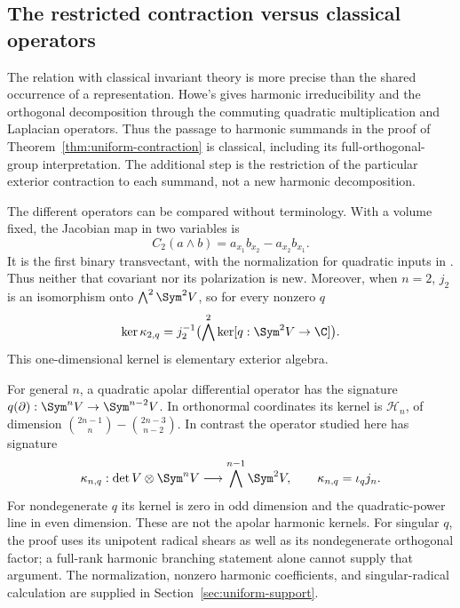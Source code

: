 \subsection{The restricted contraction versus classical operators}
\label{sec:operator-signatures}

The relation with classical invariant theory is more precise than the
shared occurrence of a representation.  Howe's
\cite[Theorem~9 and \S4(a), pp.~555--557]{HoweClassical} gives harmonic
irreducibility and the orthogonal decomposition through the commuting
quadratic multiplication and Laplacian operators.  Thus the passage
to harmonic summands in the proof of
Theorem~\ref{thm:uniform-contraction} is classical, including its
full-orthogonal-group interpretation.  The additional step is the
restriction of the particular exterior contraction to each summand,
not a new harmonic decomposition.

The different operators can be compared without terminology.  With a
volume fixed, the Jacobian map in two variables is
\[
 C_2(a\wedge b)=a_{x_1}b_{x_2}-a_{x_2}b_{x_1}.
\]
It is the first binary transvectant, with the normalization for
quadratic inputs in \cite[\S2.2, Definition~2.6 and Remark~2.7]{OliveGordan}.
Thus neither that covariant nor its polarization is new.  Moreover,
when \(n=2\), \(j_2\) is an isomorphism onto
\(\bigwedge^2\Sym^2V\), so for every nonzero \(q\)
\begin{equation}\label{eq:binary-kernel-classical}
 \ker\kappa_{2,q}
  =j_2^{-1}\bigl(\bigwedge^2\ker[q:\Sym^2V\to\C]\bigr).
\end{equation}
This one-dimensional kernel is elementary exterior algebra.

For general \(n\), a quadratic apolar differential operator has the
signature
\(q(\partial):\Sym^nV\to\Sym^{n-2}V\).  In orthonormal
coordinates its kernel is \(\mathcal H_n\), of dimension
\(\binom{2n-1}{n}-\binom{2n-3}{n-2}\).  In contrast the
operator studied here has signature
\[
 \kappa_{n,q}:\det V\otimes\Sym^nV
       \longrightarrow\bigwedge^{n-1}\Sym^2V,
       \qquad \kappa_{n,q}=\iota_qj_n.
\]
For nondegenerate \(q\) its kernel is zero in odd dimension and
the quadratic-power line in even dimension.  These are not the
apolar harmonic kernels.  For singular \(q\), the proof uses its
unipotent radical shears as well as its nondegenerate orthogonal
factor; a full-rank harmonic branching statement alone cannot supply
that argument.  The normalization, nonzero harmonic coefficients,
and singular-radical calculation are supplied in
Section~\ref{sec:uniform-support}.

